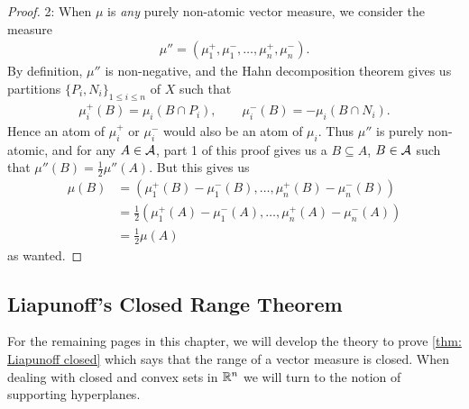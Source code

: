 \begin{proof}
2: When $\mu$ is \emph{any} purely non-atomic vector measure, we consider the measure
\begin{align*}
	\mu''=(\mu_{1}^{+}, \mu_{1}^{-}, \dots, \mu_{n}^{+}, \mu_{n}^{-}).
\end{align*}
By definition, $\mu''$ is non-negative, and the Hahn decomposition theorem gives us partitions $\{P_{i}, N_{i}\}_{1\le i \le n}$ of $X$ such that
\begin{align*}
	\mu_{i}^{+}(B)=\mu_{i}(B\cap P_{i}), \qquad \mu_{i}^{-}(B)=-\mu_{i}(B\cap N_{i}).
\end{align*}
Hence an atom of $\mu_{i}^{+}$ or $\mu_{i}^{-}$ would also be an atom of $\mu_{i}$. Thus $\mu''$ is purely non-atomic, and for any $A\in \mathcal{A}$, part 1 of this proof gives us a $B\subseteq A$, $B\in \mathcal{A}$ such that $\mu''(B)=\frac{1}{2}\mu''(A)$. But this gives us
\begin{align*}
	\mu(B)&=(\mu_{1}^{+}(B) - \mu_{1}^{-}(B), \dots, \mu_{n}^{+}(B) - \mu_{n}^{-}(B)) \\
	&=\frac{1}{2}(\mu_{1}^{+}(A) - \mu_{1}^{-}(A), \dots, \mu_{n}^{+}(A) - \mu_{n}^{-}(A)) \\
	&=\frac{1}{2}\mu(A)
\end{align*}
as wanted.
\end{proof}


\subsection{Liapunoff's Closed Range Theorem}

For the remaining pages in this chapter, we will develop the theory to prove \cref{thm: Liapunoff closed} which says that the range of a vector measure is closed. When dealing with closed and convex sets in $\mathbb{R}^{n}$ we will turn to the notion of supporting hyperplanes.

